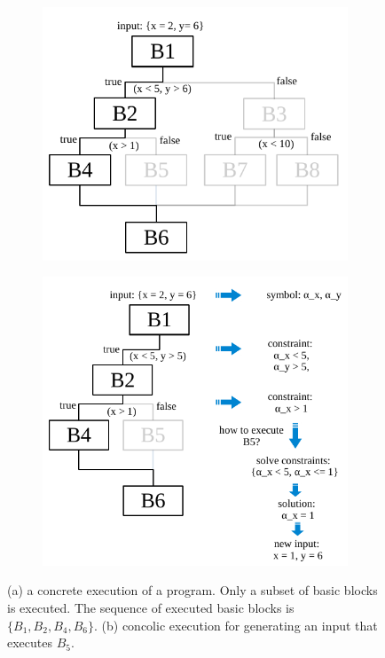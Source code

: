 \begin{figure}[t]
  \vspace{-3mm}
  \centering
  \begin{subfigure}{.5\textwidth}
    \centering
    \includegraphics[width=0.9\columnwidth]{images/concrete-execution} 
    \vspace{15mm}
    \caption{}
  \end{subfigure}%
  \begin{subfigure}{.5\textwidth}
    \centering
    \includegraphics[width=1.0\columnwidth]{images/concolic-execution} 
    \caption{}
  \end{subfigure}
  \caption{(a) a concrete execution of a program. Only a subset of basic blocks is executed. The sequence of executed basic blocks is $\{B_1, B_2, B_4, B_6\}$. (b) concolic execution for generating an input that executes $B_5$.}
  \label{fig:example-concrete-execution}
  \vspace{-3mm}
\end{figure}

